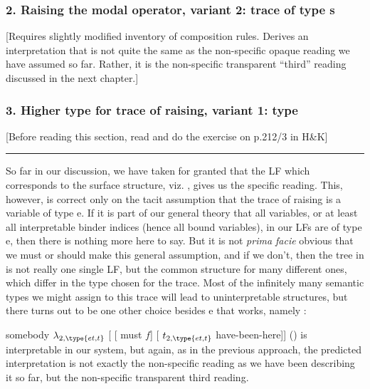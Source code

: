 \subsubsection{2. Raising the modal operator, variant 2: trace of type s}

[Requires slightly modified inventory of composition rules. Derives an
interpretation that is not quite the same as the non-specific opaque reading we
have assumed so far. Rather, it is the non-specific transparent ``third''
reading discussed in the next chapter.]

\subsubsection{3. Higher type for trace of raising, variant 1: type }

[Before reading this section, read and do the exercise on p.212/3 in H\&K]

\plainbreak{1}

So far in our discussion, we have taken for granted that the LF which
corresponds to the surface structure, viz. , gives us the specific
reading. This, however, is correct only on the tacit assumption that the trace
of raising is a variable of type e. If it is part of our general theory that all
variables, or at least all interpretable binder indices (hence all bound
variables), in our LFs are of type e, then there is nothing more here to say.
But it is not \emph{prima facie} obvious that we must or should make this
general assumption, and if we don't, then the tree in  is not really
one single LF, but the common structure for many different ones, which differ in
the type chosen for the trace. Most of the infinitely many semantic types we
might assign to this trace will lead to uninterpretable structures, but there
turns out to be one other choice besides e that works, namely :

\ex somebody $\lambda_{2,\type{et,t}}$ [ [ must $f$] [ $t_{2,\type{et,t}}$
have-been-here]]\xe
%
%
(\lastx) is interpretable in our system, but again, as in the previous approach,
the predicted interpretation is not exactly the non-specific reading as we have
been describing it so far, but the non-specific transparent third reading.

